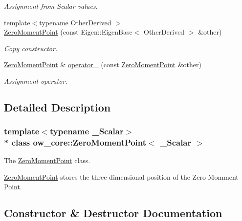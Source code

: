 \begin{DoxyCompactItemize}
\begin{DoxyCompactList}\small\item\em Assignment from Scalar values. \end{DoxyCompactList}\item 
{\footnotesize template$<$typename Other\+Derived $>$ }\\\hyperlink{classow__core_1_1ZeroMomentPoint_a18225ae81ecf8474e4c3356f895d6c5a}{Zero\+Moment\+Point} (const Eigen\+::\+Eigen\+Base$<$ Other\+Derived $>$ \&other)
\begin{DoxyCompactList}\small\item\em Copy constructor. \end{DoxyCompactList}\item 
\hyperlink{classow__core_1_1ZeroMomentPoint}{Zero\+Moment\+Point} \& \hyperlink{classow__core_1_1ZeroMomentPoint_aecdce26d540576cdc8a0d338dd633273}{operator=} (const \hyperlink{classow__core_1_1ZeroMomentPoint}{Zero\+Moment\+Point} \&other)\hypertarget{classow__core_1_1ZeroMomentPoint_aecdce26d540576cdc8a0d338dd633273}{}\label{classow__core_1_1ZeroMomentPoint_aecdce26d540576cdc8a0d338dd633273}

\begin{DoxyCompactList}\small\item\em Assignment operator. \end{DoxyCompactList}\end{DoxyCompactItemize}


\subsection{Detailed Description}
\subsubsection*{template$<$typename \+\_\+\+Scalar$>$\\*
class ow\+\_\+core\+::\+Zero\+Moment\+Point$<$ \+\_\+\+Scalar $>$}

The \hyperlink{classow__core_1_1ZeroMomentPoint}{Zero\+Moment\+Point} class. 

\hyperlink{classow__core_1_1ZeroMomentPoint}{Zero\+Moment\+Point} stores the three dimensional position of the Zero Momment Point. 

\subsection{Constructor \& Destructor Documentation}
